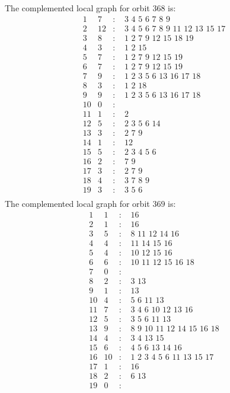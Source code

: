 \documentclass[12pt]{article}
\begin{document}
The complemented local graph for orbit $368$ is:
\begin{equation*}
\begin{array}{rrcl}
1&7&:&\,\,3\,\,4\,\,5\,\,6\,\,7\,\,8\,\,9\\
2&12&:&\,\,3\,\,4\,\,5\,\,6\,\,7\,\,8\,\,9\,\,11\,\,12\,\,13\,\,15\,\,17\\
3&8&:&\,\,1\,\,2\,\,7\,\,9\,\,12\,\,15\,\,18\,\,19\\
4&3&:&\,\,1\,\,2\,\,15\\
5&7&:&\,\,1\,\,2\,\,7\,\,9\,\,12\,\,15\,\,19\\
6&7&:&\,\,1\,\,2\,\,7\,\,9\,\,12\,\,15\,\,19\\
7&9&:&\,\,1\,\,2\,\,3\,\,5\,\,6\,\,13\,\,16\,\,17\,\,18\\
8&3&:&\,\,1\,\,2\,\,18\\
9&9&:&\,\,1\,\,2\,\,3\,\,5\,\,6\,\,13\,\,16\,\,17\,\,18\\
10&0&:&\\
11&1&:&\,\,2\\
12&5&:&\,\,2\,\,3\,\,5\,\,6\,\,14\\
13&3&:&\,\,2\,\,7\,\,9\\
14&1&:&\,\,12\\
15&5&:&\,\,2\,\,3\,\,4\,\,5\,\,6\\
16&2&:&\,\,7\,\,9\\
17&3&:&\,\,2\,\,7\,\,9\\
18&4&:&\,\,3\,\,7\,\,8\,\,9\\
19&3&:&\,\,3\,\,5\,\,6\\
\end{array}
\end{equation*}
The complemented local graph for orbit $369$ is:
\begin{equation*}
\begin{array}{rrcl}
1&1&:&\,\,16\\
2&1&:&\,\,16\\
3&5&:&\,\,8\,\,11\,\,12\,\,14\,\,16\\
4&4&:&\,\,11\,\,14\,\,15\,\,16\\
5&4&:&\,\,10\,\,12\,\,15\,\,16\\
6&6&:&\,\,10\,\,11\,\,12\,\,15\,\,16\,\,18\\
7&0&:&\\
8&2&:&\,\,3\,\,13\\
9&1&:&\,\,13\\
10&4&:&\,\,5\,\,6\,\,11\,\,13\\
11&7&:&\,\,3\,\,4\,\,6\,\,10\,\,12\,\,13\,\,16\\
12&5&:&\,\,3\,\,5\,\,6\,\,11\,\,13\\
13&9&:&\,\,8\,\,9\,\,10\,\,11\,\,12\,\,14\,\,15\,\,16\,\,18\\
14&4&:&\,\,3\,\,4\,\,13\,\,15\\
15&6&:&\,\,4\,\,5\,\,6\,\,13\,\,14\,\,16\\
16&10&:&\,\,1\,\,2\,\,3\,\,4\,\,5\,\,6\,\,11\,\,13\,\,15\,\,17\\
17&1&:&\,\,16\\
18&2&:&\,\,6\,\,13\\
19&0&:&\\
\end{array}
\end{equation*}
\end{document}
